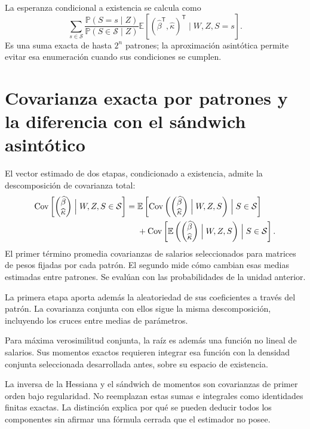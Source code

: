 \documentclass[11pt,a4paper]{article}
\newcommand{\E}{\mathbb E}
\newcommand{\Prob}{\mathbb P}
\DeclareMathOperator{\Cov}{Cov}
\begin{document}
La esperanza condicional a existencia se calcula como
\[
\sum_{s\in\mathcal S}
\frac{\Prob(S=s\mid Z)}{\Prob(S\in\mathcal S\mid Z)}
\E[(\widehat\beta^{\mathsf T},\widehat\kappa)^{\mathsf T}\mid W,Z,S=s].
\]
Es una suma exacta de hasta $2^n$ patrones; la aproximación asintótica permite evitar esa enumeración cuando sus condiciones se cumplen.

\clearpage
\section{Covarianza exacta por patrones y la diferencia con el sándwich asintótico}

El vector estimado de dos etapas, condicionado a existencia, admite la descomposición de covarianza total:
\[
\begin{aligned}
\Cov\left[\begin{pmatrix}\widehat\beta\\\widehat\kappa\end{pmatrix}
\Bigm|W,Z,S\in\mathcal S\right]
={}&
\E\left[
\Cov\left(\begin{pmatrix}\widehat\beta\\\widehat\kappa\end{pmatrix}
\Bigm|W,Z,S\right)\Bigm|S\in\mathcal S\right]\\
&+\Cov\left[
\E\left(\begin{pmatrix}\widehat\beta\\\widehat\kappa\end{pmatrix}
\Bigm|W,Z,S\right)\Bigm|S\in\mathcal S\right].
\end{aligned}
\]
El primer término promedia covarianzas de salarios seleccionados para matrices de pesos fijadas por cada patrón. El segundo mide cómo cambian esas medias estimadas entre patrones. Se evalúan con las probabilidades de la unidad anterior.

La primera etapa aporta además la aleatoriedad de sus coeficientes a través del patrón. La covarianza conjunta con ellos sigue la misma descomposición, incluyendo los cruces entre medias de parámetros.

Para máxima verosimilitud conjunta, la raíz es además una función no lineal de salarios. Sus momentos exactos requieren integrar esa función con la densidad conjunta seleccionada desarrollada antes, sobre su espacio de existencia.

La inversa de la Hessiana y el sándwich de momentos son covarianzas de primer orden bajo regularidad. No reemplazan estas sumas e integrales como identidades finitas exactas. La distinción explica por qué se pueden deducir todos los componentes sin afirmar una fórmula cerrada que el estimador no posee.
\end{document}
